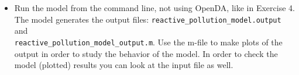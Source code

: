 \documentclass[a4paper,10pt]{article}
\begin{document}
\begin{itemize}
\item Run the model from the command line, not using OpenDA, like in Exercise 4. The model
  generates the output files: {\tt reactive\_pollution\_model.output} and
  \\ {\tt reactive\_pollution\_model\_output.m}. Use the m-file to make plots
  of the output in order to study the behavior of the model. In order to check
  the model (plotted) results you can look at the input file as well.
\end{itemize}


\end{document}
